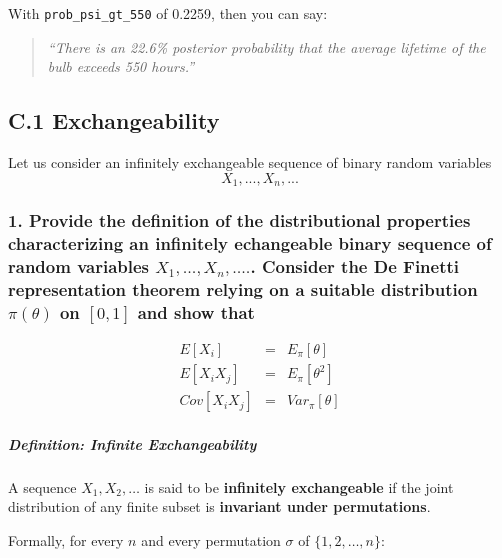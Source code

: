 \documentclass[
]{article}
\begin{document}
With \texttt{prob\_psi\_gt\_550} of 0.2259, then you can say:

\begin{quote}
\emph{``There is an 22.6\% posterior probability that the average
lifetime of the bulb exceeds 550 hours.''}
\end{quote}

\newpage

\subsection{C.1 Exchangeability}\label{c.1-exchangeability}

Let us consider an infinitely exchangeable sequence of binary random
variables \[X_1,...,X_n,...\]

\subsubsection{\texorpdfstring{1. Provide the definition of the
distributional properties characterizing an infinitely echangeable
binary sequence of random variables \(X_1, ...,X_n, ....\). Consider the
De Finetti representation theorem relying on a suitable distribution
\(\pi(\theta)\) on \([0,1]\) and show
that}{1. Provide the definition of the distributional properties characterizing an infinitely echangeable binary sequence of random variables X\_1, ...,X\_n, ..... Consider the De Finetti representation theorem relying on a suitable distribution \textbackslash pi(\textbackslash theta) on {[}0,1{]} and show that}}\label{provide-the-definition-of-the-distributional-properties-characterizing-an-infinitely-echangeable-binary-sequence-of-random-variables-x_1-...x_n-.....-consider-the-de-finetti-representation-theorem-relying-on-a-suitable-distribution-pitheta-on-01-and-show-that}

\begin{eqnarray*} 
E[X_i]&=&E_{\pi}[\theta]\\
E[X_i X_j] &=& E_{\pi}[\theta^2]\\
Cov[X_i X_j] &=& Var_{\pi}[\theta]
\end{eqnarray*}

\subparagraph{Definition: Infinite
Exchangeability}\label{definition-infinite-exchangeability}

A sequence \(X_1, X_2, \dots\) is said to be \textbf{infinitely
exchangeable} if the joint distribution of any finite subset is
\textbf{invariant under permutations}.

Formally, for every \(n\) and every permutation \(\sigma\) of
\(\{1, 2, \dots, n\}\):
\end{document}
